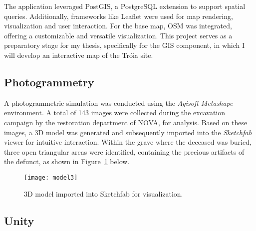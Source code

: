 
The application leveraged PostGIS, a PostgreSQL extension to support spatial queries.
Additionally, frameworks like Leaflet were used for map rendering, visualization and user interaction. For the base map, \gls{OSM} was integrated, offering a customizable and versatile visualization. This project serves as a preparatory stage for my thesis, specifically for the \gls{GIS} component, in which I will develop an interactive map of the Tróia site.

\subsection{Photogrammetry}
\label{sec:photogrammetry_previous} 

A photogrammetric simulation was conducted using the \textit{Agisoft Metashape} environment. A total of 143 images were collected during the excavation campaign by the restoration department of NOVA, for analysis. 
Based on these images, a \gls{3D} model was generated and subsequently imported into the \textit{Sketchfab} viewer for intuitive interaction.
Within the grave where the deceased was buried, three open triangular areas were identified, containing the precious artifacts of the defunct, as shown in Figure~\ref{fig:model3} below.

\begin{figure}[h]
    \centering
    \texttt{[image: model3]}
    \caption{\gls{3D} model imported into Sketchfab for visualization.}
    \label{fig:model3}
\end{figure}


\subsection{Unity}
\label{sec:unity} 

